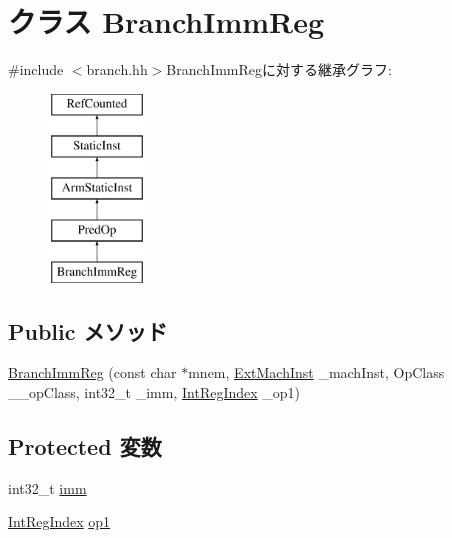 \hypertarget{classArmISA_1_1BranchImmReg}{
\section{クラス BranchImmReg}
\label{classArmISA_1_1BranchImmReg}
}


{\ttfamily \#include $<$branch.hh$>$}BranchImmRegに対する継承グラフ:\begin{figure}[H]
\begin{center}
\leavevmode
\includegraphics[height=5cm]{classArmISA_1_1BranchImmReg}
\end{center}
\end{figure}
\subsection*{Public メソッド}
\begin{DoxyCompactItemize}
\item 
\hyperlink{classArmISA_1_1BranchImmReg_a02050563f2ca5dc5583c307012b4f34f}{BranchImmReg} (const char $\ast$mnem, \hyperlink{classStaticInst_a5605d4fc727eae9e595325c90c0ec108}{ExtMachInst} \_\-machInst, OpClass \_\-\_\-opClass, int32\_\-t \_\-imm, \hyperlink{namespaceArmISA_ae64680ba9fb526106829d6bf92fc791b}{IntRegIndex} \_\-op1)
\end{DoxyCompactItemize}
\subsection*{Protected 変数}
\begin{DoxyCompactItemize}
\item 
int32\_\-t \hyperlink{classArmISA_1_1BranchImmReg_a71f011dbd3228d41f9e08aaf8c133f77}{imm}
\item 
\hyperlink{namespaceArmISA_ae64680ba9fb526106829d6bf92fc791b}{IntRegIndex} \hyperlink{classArmISA_1_1BranchImmReg_a4c465c43ad568f8bcf8ae71480e9cfea}{op1}
\end{DoxyCompactItemize}


